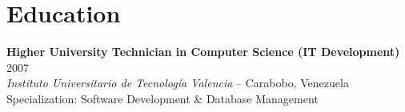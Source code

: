\documentclass[11pt,a4paper]{article}
\begin{document}
\section*{Education}

\textbf{Higher University Technician in Computer Science (IT Development)} \hfill 2007\\
\textit{Instituto Universitario de Tecnología Valencia} -- Carabobo, Venezuela\\
Specialization: Software Development \& Database Management
\end{document}
